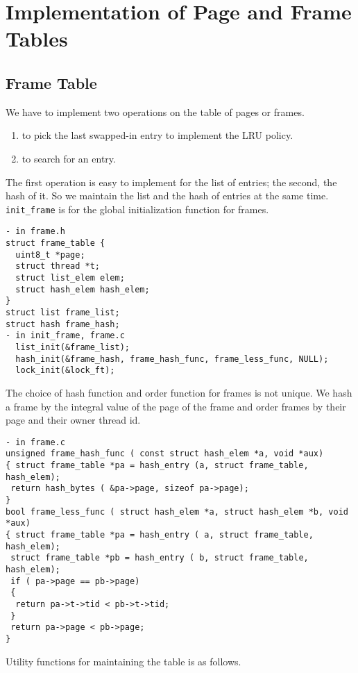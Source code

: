 \documentclass[a4paper,article,11pt,oneside]{article}
\begin{document}
\section{Implementation of Page and Frame Tables}\label{secimpl}
\subsection{Frame Table}
We have to implement two operations on the table of pages or frames.
\begin{enumerate}
\item to pick the last swapped-in entry to implement the LRU policy.
\item to search for an entry.
\end{enumerate}
The first operation is easy to implement for the list of entries; the
second, the hash of it. So we maintain the list and the hash of
entries at the same time. \texttt{init\_frame} is for the global
initialization function for frames.
\begin{verbatim}
- in frame.h
struct frame_table {
  uint8_t *page;
  struct thread *t;
  struct list_elem elem;
  struct hash_elem hash_elem;
}
struct list frame_list;
struct hash frame_hash;
- in init_frame, frame.c
  list_init(&frame_list);
  hash_init(&frame_hash, frame_hash_func, frame_less_func, NULL);
  lock_init(&lock_ft);
\end{verbatim}
The choice of hash function and order function for frames is
not unique. We hash a frame by the integral value of the page of the
frame and order frames by their page and their owner thread id.
\begin{verbatim}
- in frame.c
unsigned frame_hash_func ( const struct hash_elem *a, void *aux)
{ struct frame_table *pa = hash_entry (a, struct frame_table, hash_elem);
 return hash_bytes ( &pa->page, sizeof pa->page);
}
bool frame_less_func ( struct hash_elem *a, struct hash_elem *b, void *aux)
{ struct frame_table *pa = hash_entry ( a, struct frame_table, hash_elem);
 struct frame_table *pb = hash_entry ( b, struct frame_table, hash_elem);
 if ( pa->page == pb->page)
 {
  return pa->t->tid < pb->t->tid;
 }
 return pa->page < pb->page;
}
\end{verbatim}
Utility functions for maintaining the table is as follows.
\end{document}
